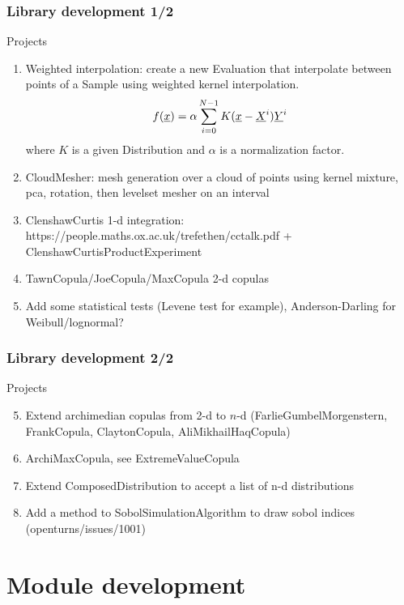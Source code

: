 \documentclass[8pt]{beamer}
\begin{document}
\begin{frame}
  \frametitle{Library development 1/2}
  \begin{block}{Projects}
    \begin{enumerate}
      \item Weighted interpolation: create a new Evaluation that interpolate between points of a Sample using weighted kernel interpolation.
        \begin{equation}
          f({\underline{x}})=\alpha\sum_{i=0}^{N-1}K({\underline{x}}-{\underline{X}}^i){\underline{Y}}^i
        \end{equation}
where $K$ is a given Distribution and $\alpha$ is a normalization factor.
      \item CloudMesher: mesh generation over a cloud of points using kernel mixture, pca, rotation, then levelset mesher on an interval
      \item ClenshawCurtis 1-d integration: https://people.maths.ox.ac.uk/trefethen/cctalk.pdf + ClenshawCurtisProductExperiment
      \item TawnCopula/JoeCopula/MaxCopula 2-d copulas
      \item Add some statistical tests (Levene test for example), Anderson-Darling for Weibull/lognormal?
    \end{enumerate}
  \end{block}
\end{frame}

\begin{frame}
  \frametitle{Library development 2/2}
  \begin{block}{Projects}
    \begin{enumerate}
      \setcounter{enumi}{4}
      \item Extend archimedian copulas from 2-d to $n$-d (FarlieGumbelMorgenstern, FrankCopula, ClaytonCopula, AliMikhailHaqCopula)
      \item ArchiMaxCopula, see ExtremeValueCopula
      \item Extend ComposedDistribution to accept a list of n-d distributions
      \item Add a method to SobolSimulationAlgorithm to draw sobol indices (openturns/issues/1001)
    \end{enumerate}
  \end{block}
\end{frame}



\section{Module development}
\end{document}
